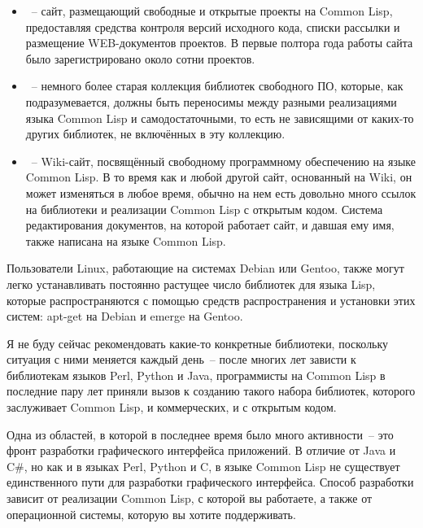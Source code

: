 \begin{itemize}
\item {}~-- сайт, размещающий свободные
  и открытые проекты на Common Lisp, предоставляя средства контроля версий исходного кода,
  списки рассылки и размещение WEB-документов проектов. В первые полтора года работы сайта
  было зарегистрировано около сотни проектов.

\item {}~-- немного более старая коллекция библиотек
  свободного ПО, которые, как подразумевается, должны быть переносимы между разными
  реализациями языка Common Lisp и самодостаточными, то есть не зависящими от каких-то
  других библиотек, не включённых в эту коллекцию.

\item {}~-- Wiki-сайт, посвящённый
  свободному программному обеспечению на языке Common Lisp. В то время как и любой другой
  сайт, основанный на Wiki, он может изменяться в любое время, обычно на нем есть довольно
  много ссылок на библиотеки и реализации Common Lisp с открытым кодом. Система
  редактирования документов, на которой работает сайт, и давшая ему имя, также написана на
  языке Common Lisp.
\end{itemize}

Пользователи Linux, работающие на системах Debian или Gentoo, также могут легко
устанавливать постоянно растущее число библиотек для языка Lisp, которые распространяются
с помощью средств распространения и установки этих систем: apt-get на Debian и emerge на
Gentoo.

Я не буду сейчас рекомендовать какие-то конкретные библиотеки, поскольку ситуация с ними
меняется каждый день~-- после многих лет зависти к библиотекам языков Perl, Python и
Java, программисты на Common Lisp в последние пару лет приняли вызов к созданию такого
набора библиотек, которого заслуживает Common Lisp, и коммерческих, и с открытым кодом.

Одна из областей, в которой в последнее время было много активности~-- это фронт
разработки графического интерфейса приложений. В отличие от Java и C\#, но как и в языках
Perl, Python и C, в языке Common Lisp не существует единственного пути для разработки
графического интерфейса. Способ разработки зависит от реализации Common Lisp, с которой вы
работаете, а также от операционной системы, которую вы хотите поддерживать.


